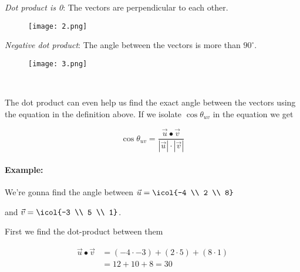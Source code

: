 \documentclass{article}
\begin{document}
\begin{minipage}{0.45\textwidth}
\begin{flushleft}
\textit{Dot product is 0}: The vectors are perpendicular to each other. 
\end{flushleft}
\end{minipage} \hfill
\begin{minipage}{0.45\textwidth}
\begin{figure}[H]
\texttt{[image: 2.png]}
\end{figure}
\end{minipage}


\begin{minipage}{0.45\textwidth}
\begin{flushleft}
\textit{Negative dot product}: The angle between the vectors is more than $90^\circ$.  
\end{flushleft}
\end{minipage} \hfill
\begin{minipage}{0.45\textwidth}
\begin{figure}[H]
\texttt{[image: 3.png]}
\end{figure}
\end{minipage}

\

The dot product can even help us find the exact angle between the vectors using the equation in the definition above. If we isolate $\cos \theta_{uv}$ in the equation we get 

\begin{equation} \label{eq:angleDot}
\cos\theta_{uv}=\frac{\vec{u}\bullet\vec{v}}{|\vec{u}|\cdot|\vec{v}|}
\end{equation}

\paragraph{Example:} 

We're gonna find the angle between $\vec{u} = \icol{-4 \\ 2 \\ 8}$

and $\vec{v} = \icol{-3 \\ 5 \\ 1}$.

First we find the dot-product between them

\begin{align*}
\vec{u}\bullet\vec{v} &= (-4\cdot -3)+(2\cdot 5)+(8\cdot 1)\\
&= 12+10+8=30
\end{align*}
\end{document}
